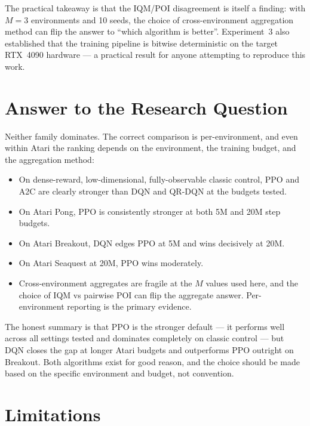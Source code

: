 The practical takeaway is that the IQM/POI disagreement is itself a
finding: with $M=3$ environments and 10 seeds, the choice of
cross-environment aggregation method can flip the answer to ``which
algorithm is better''. Experiment~3 also established that the training
pipeline is bitwise deterministic on the target RTX~4090 hardware --- a
practical result for anyone attempting to reproduce this work.

\section{Answer to the Research Question}

Neither family dominates. The correct comparison is per-environment,
and even within Atari the ranking depends on the environment, the
training budget, and the aggregation method:

\begin{itemize}
  \item On dense-reward, low-dimensional, fully-observable classic
  control, PPO and A2C are clearly stronger than DQN and QR-DQN at the
  budgets tested.
  \item On Atari Pong, PPO is consistently stronger at both 5M and 20M
  step budgets.
  \item On Atari Breakout, DQN edges PPO at 5M and wins decisively at
  20M.
  \item On Atari Seaquest at 20M, PPO wins moderately.
  \item Cross-environment aggregates are fragile at the $M$ values used
  here, and the choice of IQM vs pairwise POI can flip the aggregate
  answer. Per-environment reporting is the primary evidence.
\end{itemize}

The honest summary is that PPO is the stronger default --- it performs
well across all settings tested and dominates completely on classic
control --- but DQN closes the gap at longer Atari budgets and
outperforms PPO outright on Breakout. Both algorithms exist for good
reason, and the choice should be made based on the specific environment
and budget, not convention.

\section{Limitations}

